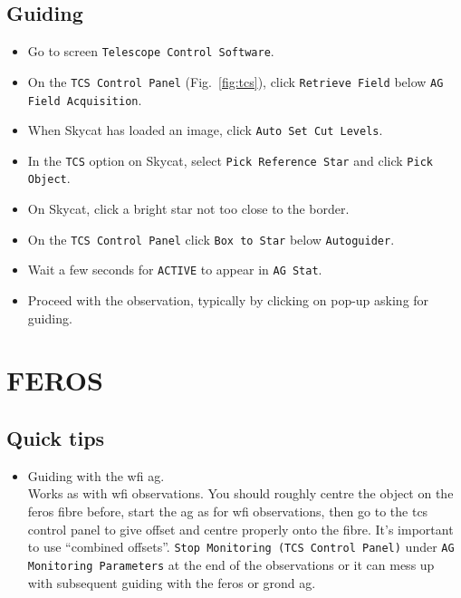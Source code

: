 \documentclass[11pt,fleqn]{book} %
\begin{document}
\subsection{Guiding}
\label{sec:guidewfi}

\begin{itemize}
  \item Go to screen \texttt{Telescope Control Software}.
  \item On the \texttt{TCS Control Panel} (Fig.~\ref{fig:tcs}), click \texttt{Retrieve Field} below \texttt{AG Field Acquisition}.
  \item When Skycat has loaded an image, click \texttt{Auto Set Cut Levels}.
  \item In the \texttt{TCS} option on Skycat, select \texttt{Pick Reference Star} and click \texttt{Pick Object}.
  \item On Skycat, click a bright star not too close to the border. 
  \item On the \texttt{TCS Control Panel} click \texttt{Box to Star} below \texttt{Autoguider}.
  \item Wait a few seconds for \texttt{\-\-\-ACTIVE\-\-\-}  to appear in \texttt{AG Stat}.
  \item Proceed with the observation, typically by clicking on pop-up asking for guiding.
\end{itemize}

\section{FEROS}

\subsection{Quick tips}

\begin{itemize}
\item Guiding with the \gls{wfi} \gls{ag}.\\
Works as with \gls{wfi} observations.  You should roughly centre the
object on the \gls{feros} fibre before, start the \gls{ag} as for \gls{wfi}
observations, then go to the \gls{tcs} control panel to give offset and
centre properly onto the fibre.  It's important to use ``combined offsets''.
\texttt{Stop Monitoring (TCS Control Panel)} under \texttt{AG Monitoring Parameters} at the end of the observations or it can mess
up with subsequent guiding with the \gls{feros} or \gls{grond} \gls{ag}.
\end{itemize}
\end{document}
